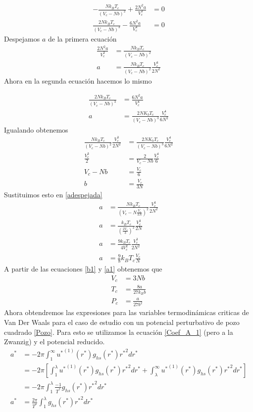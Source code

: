 \documentclass[12pt,letterpaper]{article}
\begin{document}
\begin{enumerate}
\begin{align*}
	 -\frac{Nk_BT_c}{(V_c-Nb)^2} + \frac{2N^2a}{V_c^3} &= 0\\
	\frac{2Nk_BT_c}{(V_c-Nb)^3} - \frac{6N^2a}{V_c^4}  &= 0
\end{align*}
Despejamos $a$ de la primera ecuación
\begin{align}
\frac{2N^2a}{V_c^3} &=\frac{Nk_BT_c}{(V_c-Nb)^2} \nonumber \\
a &= \frac{Nk_B T_c}{(V_c-Nb)^2} \frac{V_c^3}{2N^2} \label{adespejada}
\end{align}
Ahora en la segunda ecuación hacemos lo mismo

\begin{align*}
\frac{2Nk_BT_c}{(V_c-Nb)^3} &= \frac{6N^2a}{V_c^4}  \\
a &= \frac{2NK_bT_c}{(V_c-Nb)^3} \frac{V_c^4}{6N^2}
\end{align*}
Igualando obtenemos
\begin{align}
\frac{Nk_B T_c}{(V_c-Nb)^2} \frac{V_c^3}{2N^2} &= \frac{2NK_bT_c}{(V_c-Nb)^3} \frac{V_c^4}{6N^2} \nonumber \\
\frac{V_c^3}{2} &= \frac{2}{V_c-Nb} \frac{V_c^4}{6}  \nonumber \\
V_c-Nb &= \frac{V_c}{6} \nonumber\\
b &= \frac{V_c}{3N} \label{b1}
\end{align}
Sustituimos esto en \eqref{adespejada}
\begin{align}
 a &= \frac{Nk_B T_c}{(V_c- N \frac{V_c}{3N})^2} \frac{V_c^3}{2N^2}  \nonumber \\
 a &= \frac{k_B T_c}{(\frac{2V_c}{3})^2} \frac{V_c^3}{2N} \nonumber \\
 a &= \frac{9k_B T_c}{4V_c^2} \frac{V_c^3}{2N^2} \nonumber \\
 a &= \frac{9}{8}k_B T_c \frac{V_c}{N} \label{a1}
\end{align}
A partir de las ecuaciones \eqref{b1} y \eqref{a1} obtenemos que 
\begin{align}
V_c &= 3Nb \label{Vc} \\
T_c &= \frac{8a}{27k_Bb} \label{Tc}\\
P_c &= \frac{a}{27b^2} \label{Pc}
\end{align}
 Ahora obtendremos las expresiones para las variables termodinámicas criticas de Van Der Waals para el caso de estudio con un potencial perturbativo de pozo cuadrado \eqref{Pozo}. Para esto se utilizamos la ecuación \eqref{Coef_A_1} (pero a la Zwanzig) y el potencial reducido.
\begin{align}
 a^* &= -2\pi \int_1^\infty {u^*}^{(1)}(r^*) g_{hs}(r^*) {r^*}^2 dr^* \nonumber \\
  &=-2\pi  \left[ \int_1^\lambda {u^*}^{(1)}(r^*) g_{hs}(r^*) {r^*}^2 dr^* +\int_\lambda^\infty {u^*}^{(1)}(r^*) g_{hs}(r^*) {r^*}^2 dr^*  \right] \nonumber\\
  &= -2\pi \int_1^\lambda \frac{-1}{T^*} g_{hs}(r^*){r^*}^2d{r^*} \nonumber \\
 a^* &= \frac{2\pi}{T^*} \int_1^\lambda g_{hs}(r^*){r^*}^2d{r^*} \label{a_star_Integral}
\end{align}  


\end{enumerate}
\end{document}
